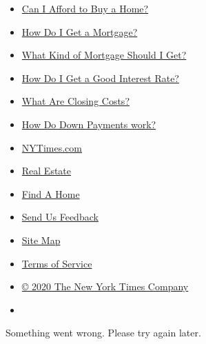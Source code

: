 \begin{itemize}
\tightlist
\item
  \href{https://www.nytimes.com/interactive/2017/realestate/Can-I-Afford-to-Buy-a-Home.html}{Can
  I Afford to Buy a Home?}
\item
  \href{https://www.nytimes.com/interactive/2017/realestate/How-Do-I-Get-a-Mortgage.html}{How
  Do I Get a Mortgage?}
\item
  \href{https://www.nytimes.com/interactive/2017/realestate/What-Kind-of-Mortgage-Should-I-Get.html}{What
  Kind of Mortgage Should I Get?}
\item
  \href{https://www.nytimes.com/interactive/2017/realestate/How-Do-I-Get-a-Good-Interest-Rate.html}{How
  Do I Get a Good Interest Rate?}
\item
  \href{https://www.nytimes.com/interactive/2017/realestate/what-are-closing-costs.html}{What
  Are Closing Costs?}
\item
  \href{https://www.nytimes.com/interactive/2017/realestate/Down-payments.html}{How
  Do Down Payments work?}
\end{itemize}

\begin{itemize}
\tightlist
\item
  \href{https://www.nytimes.com/}{NYTimes.com}
\item
  \href{https://www.nytimes.com/section/realestate}{Real Estate}
\item
  \href{https://www.nytimes.com/real-estate/find-a-home}{Find A Home}
\item
  \href{https://help.nytimes.com/hc/en-us/articles/115015385887-Contact-us}{Send
  Us Feedback}
\end{itemize}

\begin{itemize}
\tightlist
\item
  \href{http://spiderbites.nytimes.com/}{Site Map}
\item
  \href{https://help.nytimes.com/hc/en-us/articles/115014893428-Terms-of-service}{Terms
  of Service}
\item
  \href{https://help.nytimes.com/hc/en-us/articles/115014792127-Copyright-notice}{©
  2020 The New York Times Company}
\end{itemize}

\begin{itemize}
\item
\end{itemize}

Something went wrong. Please try again later.
